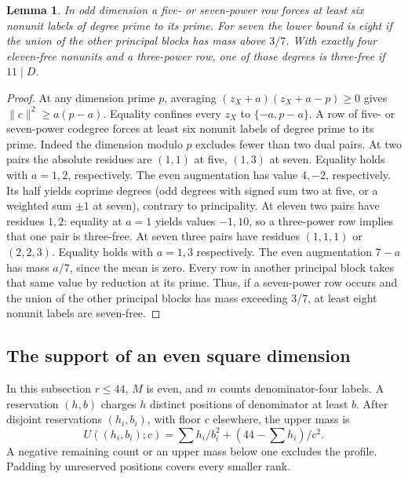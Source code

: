 \documentclass[11pt]{amsart}
\numberwithin{equation}{section}
\newtheorem{lemma}[theorem]{Lemma}
\theoremstyle{definition}
\theoremstyle{plain}
\begin{document}
\begin{lemma}
In odd dimension a five- or seven-power row forces at least six
nonunit labels of degree prime to its prime. For seven the lower
bound is eight if the union of the other principal blocks has mass
above $3/7$. With exactly four eleven-free nonunits and a three-power
row, one of those degrees is three-free if $11\mid D$.
\end{lemma}
\begin{proof}
At any dimension prime
$p$, averaging $(z_X+a)(z_X+a-p)\ge0$ gives
$\|c\|^2\ge a(p-a)$. Equality confines every $z_X$ to
$\{-a,p-a\}$. A row of five- or seven-power codegree forces at least
six nonunit labels of degree prime to its prime. Indeed the dimension
modulo $p$ excludes fewer than two dual pairs. At two pairs the
absolute residues are $(1,1)$ at five, $(1,3)$ at seven. Equality
holds with $a=1,2$, respectively. The even augmentation has value
$4,-2$, respectively. Its half yields coprime degrees (odd degrees
with signed sum two at five, or a weighted sum $\pm1$ at seven),
contrary to principality. At eleven two pairs have residues $1,2$:
equality at $a=1$ yields values $-1,10$, so a three-power row implies
that one pair is three-free. At seven three pairs have residues
$(1,1,1)$ or $(2,2,3)$. Equality holds with $a=1,3$ respectively.
The even augmentation $7-a$ has mass $a/7$, since the mean is zero.
Every row in another principal block takes that same value by reduction
at its prime. Thus, if a seven-power row occurs and the union of the other
principal blocks has mass exceeding $3/7$, at least eight nonunit labels
are seven-free.
\end{proof}

\subsection{The support of an even square dimension}
In this subsection $r\le44$, $M$ is even, and $m$ counts denominator-four
labels. A reservation $(h,b)$ charges $h$ distinct positions of denominator
at least $b$. After disjoint reservations $(h_i,b_i)$, with floor $c$
elsewhere, the upper mass is
\[
 U((h_i,b_i);c)=\sum h_i/b_i^2+(44-\sum h_i)/c^2.
\]
A negative remaining count or an upper mass below one excludes the
profile. Padding by unreserved positions covers every smaller rank.
\end{document}
